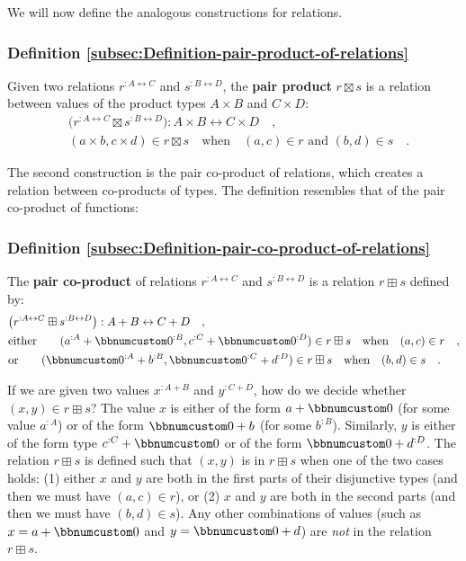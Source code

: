 We will now define the analogous constructions for relations.

\subsubsection{Definition \label{subsec:Definition-pair-product-of-relations}\ref{subsec:Definition-pair-product-of-relations}}

Given two relations $r^{:A\leftrightarrow C}$ and $s^{:B\leftrightarrow D}$,
the \textbf{pair product}  $r\boxtimes s$
is a relation between values of the product types $A\times B$ and
$C\times D$:
\begin{align*}
 & \big(r^{:A\leftrightarrow C}\boxtimes s^{:B\leftrightarrow D}\big):A\times B\leftrightarrow C\times D\quad,\\
 & (a\times b,c\times d)\in r\boxtimes s\quad\text{when}\quad(a,c)\in r\text{ and }(b,d)\in s\quad.
\end{align*}

The second construction is the pair co-product of relations,
which creates a relation between co-products of types. The definition
resembles that of the pair co-product
of functions:

\subsubsection{Definition \label{subsec:Definition-pair-co-product-of-relations}\ref{subsec:Definition-pair-co-product-of-relations}}

The \textbf{pair co-product} of relations $r^{:A\leftrightarrow C}$
and $s^{:B\leftrightarrow D}$ is a relation $r\boxplus s$ defined
by:
\begin{align*}
 & \big(r^{:A\leftrightarrow C}\boxplus s^{:B\leftrightarrow D}\big):A+B\leftrightarrow C+D\quad,\\
 & \text{either}\quad\quad(a^{:A}+\bbnum 0^{:B},c^{:C}+\bbnum 0^{:D})\in r\boxplus s\quad\text{when}\quad(a,c)\in r\quad,\\
 & \text{or}\quad\quad(\bbnum 0^{:A}+b^{:B},\bbnum 0^{:C}+d^{:D})\in r\boxplus s\quad\text{when}\quad(b,d)\in s\quad.
\end{align*}

If we are given two values $x^{:A+B}$ and $y^{:C+D}$, how do we
decide whether $(x,y)\in r\boxplus s$? The value $x$ is either of
the form $a+\bbnum 0$ (for some value $a^{:A}$) or of the form $\bbnum 0+b$
(for some $b^{:B}$). Similarly, $y$ is either of the form type $c^{:C}+\bbnum 0$
or of the form $\bbnum 0+d^{:D}$. The relation $r\boxplus s$ is
defined such that $(x,y)$ is in $r\boxplus s$ when one of the two
cases holds: (1) either $x$ and $y$ are both in the first parts
of their disjunctive types (and then we must have $(a,c)\in r$),
or (2) $x$ and $y$ are both in the second parts (and then we must
have $(b,d)\in s$). Any other combinations of values (such as $x=a+\bbnum 0$
and $y=\bbnum 0+d$) are \emph{not} in the relation $r\boxplus s$.

